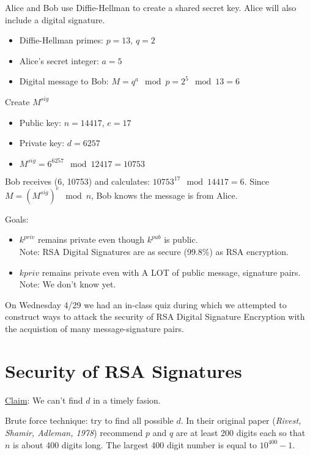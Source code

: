 \begin{example}
Alice and Bob use Diffie-Hellman to create a shared secret key. Alice will also include a digital signature.
\begin{itemize}
\item Diffie-Hellman primes: $p=13$, $q=2$
\item Alice's secret integer: $a=5$
\item Digital message to Bob: $ M = q^{a}\mod{p} = 2^{5}\mod{13} = 6$
\end{itemize}

Create $M^{sig}$
\begin{itemize}
\item Public key: $n = 14417$, $e = 17$
\item Private key: $d = 6257$
\item $M^{sig} = 6^{6257} \mod{12417 = 10753}$

\end{itemize}

Bob receives (6, 10753) and calculates:
$10753^{17}\mod{14417} = 6$.
Since $M = (M^{sig})^{e} \mod{n}$, Bob knows the message is from Alice. 
\end{example}

Goals: 
\begin{itemize}
\item $k^{priv}$ remains private even though $k^{pub}$ is public.\\
Note: RSA Digital Signatures are as secure (99.8\%) as RSA encryption.
\item $k{priv}$ remains private even with A LOT of public message, signature pairs.\\
Note: We don't know yet.
\end{itemize}




On Wednesday 4/29 we had an in-class quiz during which we attempted to construct ways to attack the security of RSA Digital Signature Encryption with the acquistion of many message-signature pairs.\\
\section{Security of RSA Signatures}

\underline{Claim}: We can't find $d$ in a timely fasion. 

Brute force technique: try to find all possible $d$.
In their original paper (\textit{Rivest, Shamir, Adleman, 1978}) recommend $p$ and $q$ are at least 200 digits each so that $n$ is about 400 digits long. The largest 400 digit number is equal to $10^{400}-1$.\\

